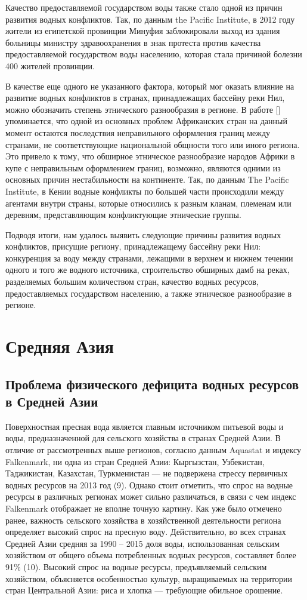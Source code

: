 \documentclass[a4paper, 12pt]{article}
\theoremstyle{plain} %
\theoremstyle{definition} %
\theoremstyle{remark} %
\begin{document}
Качество предоставляемой государством воды также стало одной из причин развития водных конфликтов. Так, по данным the Pacific Institute, в 2012 году жители из египетской провинции Минуфия заблокировали выход из здания больницы министру здравоохранения в знак протеста против качества предоставляемой государством воды населению, которая стала причиной болезни 400 жителей провинции. 

В качестве еще одного не указанного фактора, который мог оказать влияние на развитие водных конфликтов в странах, принадлежащих бассейну реки Нил, можно обозначить степень этнического разнообразия в регионе. В работе [\cite{ashton}] упоминается, что одной из основных проблем Африканских стран на данный момент остаются последствия неправильного оформления границ между странами, не соответствующие национальной общности того или иного региона. Это привело к тому, что обширное этническое разнообразие народов Африки в купе с неправильным оформлением границ, возможно, являются одними из основных причин нестабильности на континенте. Так, по данным The Pacific Institute, в Кении водные конфликты по большей части происходили между агентами внутри страны, которые относились к разным кланам, племенам или деревням, представляющим конфликтующие этнические группы.

Подводя итоги, нам удалось выявить следующие причины развития водных конфликтов, присущие региону, принадлежащему бассейну реки Нил: конкуренция за воду между странами, лежащими в верхнем и нижнем течении одного и того же водного источника, строительство обширных дамб на реках, разделяемых большим количеством стран, качество водных ресурсов, предоставляемых государством населению, а также этническое разнообразие в регионе.

\section{Средняя Азия}
\subsection{Проблема физического дефицита водных ресурсов в Средней Азии}
Поверхностная пресная вода является главным источником питьевой воды и воды, предназначенной для сельского хозяйства в странах Средней Азии. В отличие от рассмотренных выше регионов, согласно данным Aquastat и индексу Falkenmark, ни одна из стран Средней Азии: Кыргызстан, Узбекистан, Таджикистан, Казахстан, Туркменистан --- не подвержена стрессу первичных водных ресурсов на 2013 год (9). Однако стоит отметить, что спрос на водные ресурсы в различных регионах может сильно различаться, в связи с чем индекс Falkenmark отображает не вполне точную картину. Как уже было отмечено ранее, важность сельского хозяйства в хозяйственной деятельности региона определяет высокий спрос на пресную воду. Действительно, во всех странах Средней Азии средняя за 1990 – 2015 доля воды, использованная сельским хозяйством от общего объема потребленных водных ресурсов, составляет более 91\% (10). Высокий спрос на водные ресурсы, предъявляемый сельским хозяйством, объясняется особенностью культур, выращиваемых на территории стран Центральной Азии: риса и хлопка --- требующие обильное орошение.
\end{document}
